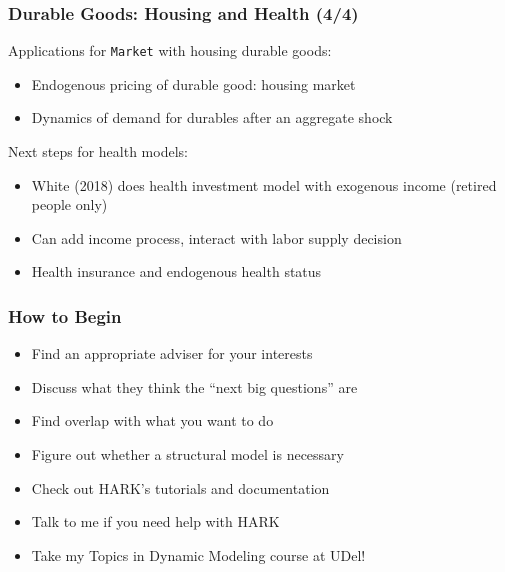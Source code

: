 \documentclass[11pt]{beamer}
\newcommand{\bi}{\begin{itemize}}
\newcommand{\ei}{\end{itemize}}
\begin{document}
\begin{frame}
\frametitle{Durable Goods: Housing and Health (4/4)}
Applications for \texttt{Market} with housing durable goods:
\bi
\item Endogenous pricing of durable good: housing market

\item Dynamics of demand for durables after an aggregate shock
\ei

Next steps for health models:
\bi
\item White (2018) does health investment model with exogenous income (retired people only)

\item Can add income process, interact with labor supply decision

\item Health insurance and endogenous health status
\ei
\end{frame}


\begin{frame}
\frametitle{How to Begin}
\bi
\item <1->Find an appropriate adviser for your interests

\item <2->Discuss what they think the ``next big questions'' are

\item <2->Find overlap with what you want to do

\item <3->Figure out whether a structural model is necessary

\item <4->Check out HARK's tutorials and documentation

\item <4->Talk to me if you need help with HARK

\item <5->Take my Topics in Dynamic Modeling course at UDel!
\ei
\end{frame}
\end{document}

